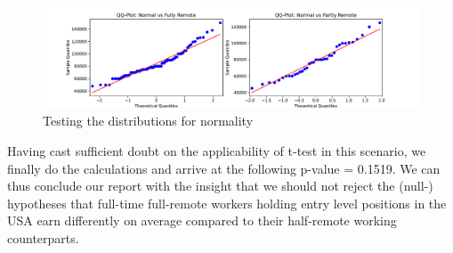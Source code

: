 \documentclass{article}
\begin{document}
\begin{figure}[!htb]
\begin{center}
\caption{Testing the distributions for normality}
\label{fig:QQ}
\hspace*{-1.3cm}   
\includegraphics[scale=0.52]{fig/QQ.pdf}
\end{center}
\end{figure}


Having cast sufficient doubt on the applicability of t-test in this scenario, we finally do the calculations and arrive at the following p-value = 0.1519. 
We can thus conclude our report with the insight that we should not reject the (null-) hypotheses that full-time full-remote workers holding entry level positions in the USA earn differently on average compared to their half-remote working counterparts. 
\end{document}
